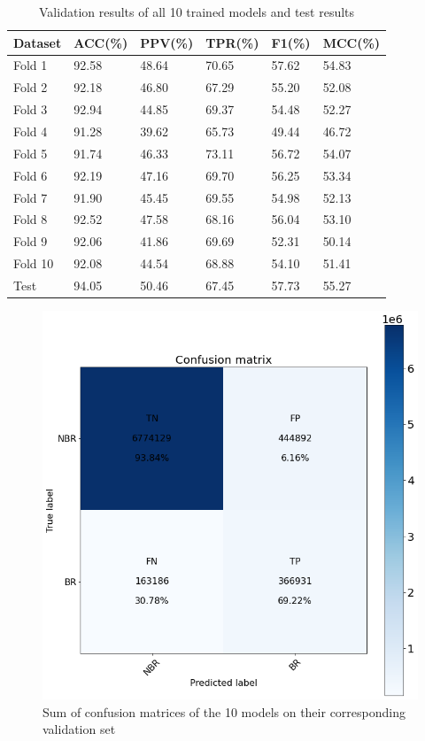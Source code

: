 \documentclass[journal=jcisd8,manuscript=article]{achemso}
\begin{document}
\begin{table}
    \centering
    \begin{tabular}{| P{2cm} | P{2cm} | P{2cm} | P{2cm} | P{2cm} | P{2cm} |}
        \hline
        Dataset & ACC(\%) & PPV(\%) & TPR(\%) & F1(\%) & MCC(\%) \\
        \hline
        Fold 1  & 92.58   & 48.64   & 70.65   & 57.62  & 54.83   \\
        Fold 2  & 92.18   & 46.80   & 67.29   & 55.20  & 52.08   \\
        Fold 3  & 92.94   & 44.85   & 69.37   & 54.48  & 52.27   \\
        Fold 4  & 91.28   & 39.62   & 65.73   & 49.44  & 46.72   \\
        Fold 5  & 91.74   & 46.33   & 73.11   & 56.72  & 54.07   \\
        Fold 6  & 92.19   & 47.16   & 69.70   & 56.25  & 53.34   \\
        Fold 7  & 91.90   & 45.45   & 69.55   & 54.98  & 52.13   \\
        Fold 8  & 92.52   & 47.58   & 68.16   & 56.04  & 53.10   \\
        Fold 9  & 92.06   & 41.86   & 69.69   & 52.31  & 50.14   \\
        Fold 10 & 92.08   & 44.54   & 68.88   & 54.10  & 51.41   \\
        Test    & 94.05   & 50.46   & 67.45   & 57.73  & 55.27   \\
        \hline
    \end{tabular}
    \caption{\label{tab:results} Validation results of all 10 trained models and test results}
\end{table}

\begin{figure}
    \centering
    \noindent\includegraphics[scale=0.4]{valid_cm.png}
    \caption{\centering Sum of confusion matrices of the 10 models on their corresponding validation set}
    \label{fig:valid_cm}
\end{figure}
\end{document}
